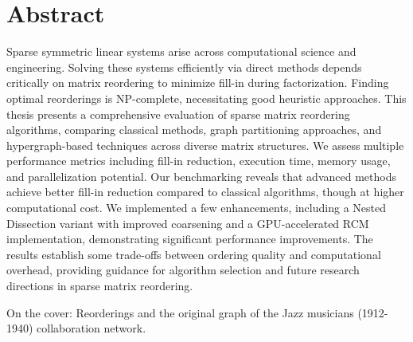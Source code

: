 \chapter*{Abstract}

Sparse symmetric linear systems arise across computational science and engineering. Solving these systems efficiently via direct methods depends critically on matrix reordering to minimize fill-in during factorization. Finding optimal reorderings is NP-complete, necessitating good heuristic approaches. This thesis presents a comprehensive evaluation of sparse matrix reordering algorithms, comparing classical methods, graph partitioning approaches, and hypergraph-based techniques across diverse matrix structures. We assess multiple performance metrics including fill-in reduction, execution time, memory usage, and parallelization potential. Our benchmarking reveals that advanced methods achieve better fill-in reduction compared to classical algorithms, though at higher computational cost. We implemented a few enhancements, including a Nested Dissection variant with improved coarsening and a GPU-accelerated RCM implementation, demonstrating significant performance improvements. The results establish some trade-offs between ordering quality and computational overhead, providing guidance for algorithm selection and future research directions in sparse matrix reordering.

\vfill

On the cover: Reorderings and the original graph of the Jazz musicians (1912-1940) collaboration network.